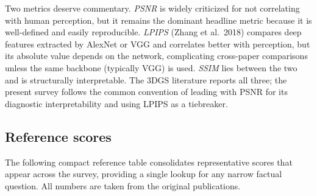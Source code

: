 \documentclass{article}
\begin{document}
Two metrics deserve commentary. \emph{PSNR} is widely criticized for not correlating with human perception, but it remains the dominant headline metric because it is well-defined and easily reproducible. \emph{LPIPS} (Zhang et al.~2018) compares deep features extracted by AlexNet or VGG and correlates better with perception, but its absolute value depends on the network, complicating cross-paper comparisons unless the same backbone (typically VGG) is used. \emph{SSIM} lies between the two and is structurally interpretable. The 3DGS literature reports all three; the present survey follows the common convention of leading with PSNR for its diagnostic interpretability and using LPIPS as a tiebreaker.

\subsection{Reference scores}\label{reference-scores}

The following compact reference table consolidates representative scores that appear across the survey, providing a single lookup for any narrow factual question. All numbers are taken from the original publications.
\end{document}

